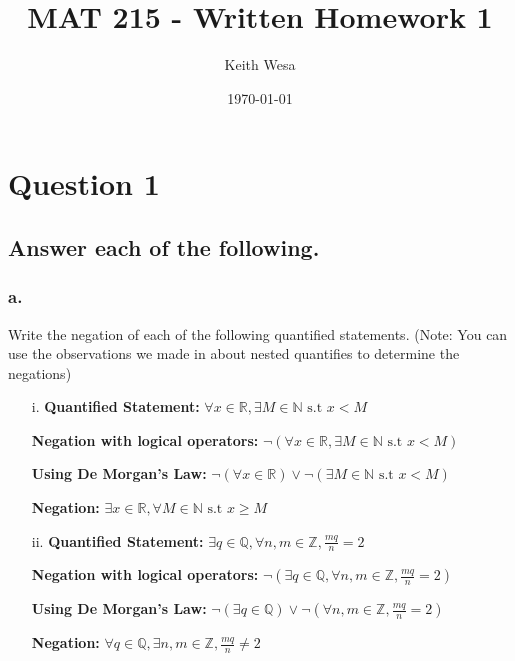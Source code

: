 \documentclass{article}
\author{Keith Wesa}
\title{MAT 215 - Written Homework 1}
\date{\today}
\begin{document}
\section*{Question 1}
\subsection*{\textbf{Answer each of the following.}}
\subsubsection*{a.} Write the negation of each of the following quantified statements. (Note:
You can use the observations we made in about nested quantifies to determine the negations)
\begin{itemize}
\item[i.] \textbf{Quantified Statement: } $\forall x \in \mathbb{R}, \exists M \in \mathbb{N} \text{ s.t } x < M$
\item[] \textbf{Negation with logical operators: } $\lnot(\forall x \in \mathbb{R}, \exists M \in \mathbb{N} \text{ s.t } x < M)$
\item[] \textbf{Using De Morgan's Law: } $\lnot(\forall x \in \mathbb{R}) \lor \lnot(\exists M \in \mathbb{N} \text{ s.t } x < M)$
\item[] \textbf{Negation: } $\exists x \in \mathbb{R}, \forall M \in \mathbb{N} \text{ s.t } x \geq M$
\item[]
\item[ii.] \textbf{Quantified Statement: }   $\exists q \in \mathbb{Q}, \forall n, m \in \mathbb{Z}, \frac{mq}{n} = 2$
\item[] \textbf{Negation with logical operators: } $\lnot(\exists q \in \mathbb{Q}, \forall n, m \in \mathbb{Z}, \frac{mq}{n} = 2)$
\item[] \textbf{Using De Morgan's Law: } $\lnot(\exists q \in \mathbb{Q}) \lor \lnot(\forall n, m \in \mathbb{Z}, \frac{mq}{n} = 2)$
\item[] \textbf{Negation: } $\forall q \in \mathbb{Q}, \exists n, m \in \mathbb{Z}, \frac{mq}{n} \neq 2$
\end{itemize}
\end{document}

